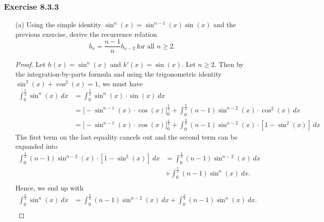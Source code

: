 \subsubsection{Exercise 8.3.3} \begin{enumerate}
    \item[(a)] Using the simple identity \( \sin^{n}(x) = \sin^{n-1}(x) \sin(x)  \) and the previous exercise, derive the recurrence relation 
        \[  b_{n} = \frac{ n-1 }{ n }  b_{n-2} \ \text{for all } n \geq 2. \]
        \begin{proof}
            Let \( h(x) = \sin^{n}(x)  \) and \( k'(x) = \sin(x)  \). Let \( n \geq 2  \). Then by the integration-by-parts formula and using the trigonometric identity \( \sin^{2}(x) + \cos^{2}(x) = 1  \), we must have 
            \begin{align*}
                \int_{ 0 }^{ \frac{ \pi  }{ 2  }   }  \sin^{n}(x) \ dx &= \int_{ 0 }^{ \frac{ \pi }{ 2 }  } \sin^{n}(x) \cdot \sin(x) \  dx  \\
                                                                       &= \Big[ - \sin^{n-1}(x) \cdot \cos(x)  \Big]_{0}^{\frac{ \pi }{ 2 }} + \int_{ 0 }^{ \frac{ \pi }{ 2 }  } (n-1)\sin^{n-2}(x) \cdot \cos^{2}(x)  \  dx \\
                                                                       &=  \Big[ - \sin^{n-1}(x) \cdot \cos(x)  \Big]_{0}^{\frac{ \pi }{ 2 }} +  \int_{ 0 }^{ \frac{ \pi }{ 2 }  } (n-1)\sin^{n-2}(x) \cdot  [ 1 - \sin^{2}(x)  ]  \  dx
            \end{align*}
        The first term on the last equality cancels out and the second term can be expanded into 
        \begin{align*}
            \int_{ 0 }^{ \frac{ \pi }{ 2 }  }  (n-1 ) \sin^{n-2}(x) \cdot [ 1 - \sin^{2}(x) ] \  dx 
                                                                                                    &= \int_{ 0 }^{ \frac{ \pi }{ 2 }   } (n-1) \sin^{n-2}(x)  \   dx \\ &+ \int_{ 0 }^{ \frac{ \pi }{ 2 }  } (n-1) \sin^{n}(x) \  dx. \\
        \end{align*}
        Hence, we end up with 
        \begin{align*}  \int_{ 0 }^{ \frac{ \pi }{ 2 }  }  \sin^{n}(x) \  dx &=  \int_{ 0 }^{ \frac{ \pi }{ 2 }   } (n-1) \sin^{n-2}(x)  \   dx + \int_{ 0 }^{ \frac{ \pi }{ 2 }  } (n-1) \sin^{n}(x) \  dx. \tag{1}  \\
        \end{align*}

\end{proof}
\end{enumerate}
